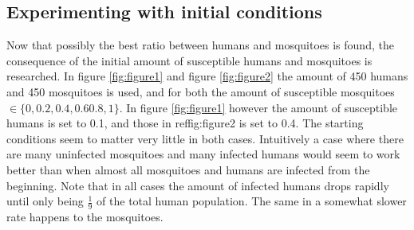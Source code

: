 \documentclass[a4paper]{report}
\begin{document}
\subsection{Experimenting with initial conditions}
Now that possibly the best ratio between humans and mosquitoes is found, 
the consequence of the initial amount of susceptible humans and mosquitoes is researched.
In figure \ref{fig:figure1} and figure \ref{fig:figure2} the amount of 450
humans and 450 mosquitoes is used, and for both the amount of susceptible mosquitoes
$\in \{0, 0.2, 0.4, 0.6 0.8, 1\}$. In figure \ref{fig:figure1} however the
amount of susceptible humans is set to 0.1, and those in ref{fig:figure2} is set to
0.4.  The starting conditions seem to matter very little in both cases.
Intuitively a case where there are many uninfected mosquitoes and many infected
humans would seem to work better than when almost all mosquitoes and humans are
infected from the beginning. Note that in all cases the amount
of infected humans drops rapidly until only being $\frac{1}{9}$ of the total
human population. The same in a somewhat slower rate happens to the mosquitoes.
\end{document}
